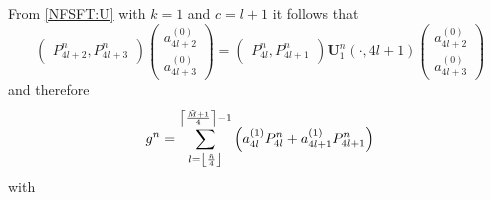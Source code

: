 From \eqref{NFSFT:U} with $k = 1$ and $c = l+1$ it follows that
\[
\left(\begin{array}{c}
  P_{4l+2}^{n}, 
  P_{4l+3}^{n}
\end{array}\right)
\left(\begin{array}{c}
  a_{4l+2}^{(0)}\\
  a_{4l+3}^{(0)} 
\end{array}\right)
=
\left(\begin{array}{c}
  P_{4l}^{n},
  P_{4l+1}^{n}
\end{array}\right)
{\mathbf{U}_{1}^{n}\left(\cdot,4l+1\right)}
\left(\begin{array}{c}
  a_{4l+2}^{(0)}\\
  a_{4l+3}^{(0)} 
\end{array}\right)
\]
and therefore
\[ 
  g^n = \sum_{l = \left\lfloor\frac{\tilde{n}}{4}\right\rfloor}^{\left\lceil\frac{\tilde{M}+1}{4}\right\rceil-1} 
  \left(a_{4l}^{(1)} P_{4l}^{n} + a_{4l+1}^{(1)} P_{4l+1}^{n}\right) 
\]
with
